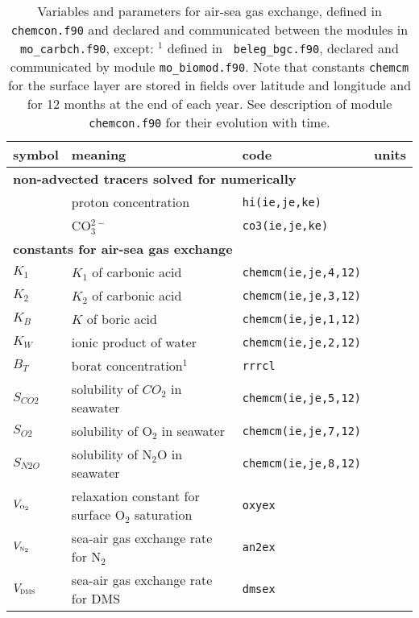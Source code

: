 \documentclass[11pt,a4paper,fleqn,twoside]{article}
\def\ntwo{\text{\textsc{n$_2$}}\,}
\def\oxy{\text{\textsc{o$_2$}}\,}
\def\dms{\text{\textsc{dms}}\,}
\def\dms{\text{\textsc{dms}}\,}
\def\hi{\text{\textsc{H$^+$}}\,}
\def\cartwo{\text{\textsc{CO$_3^{2-}$}}\,}
\begin{document}
\begin{table}[hbt]
\caption{\label{tab_air_sea_params} Variables and parameters for air-sea gas
exchange, defined in {\tt chemcon.f90} and  declared and communicated between
the modules in {\tt mo\_carbch.f90},  except: $^1$ defined in {\tt
beleg\_bgc.f90}, declared and communicated by module {\tt mo\_biomod.f90}. Note
that constants {\tt chemcm} for the surface layer are stored in fields over
latitude and longitude and for 12 months at the end of each year.
See description of module {\tt chemcon.f90} for their evolution with time.} 
\vspace{.2cm}
\begin{center}
\begin{tabular}{llll} \hline
symbol & meaning        & code     & units \\ \hline
\multicolumn{4}{l}{\rule{0mm}{4mm}\bf non-advected tracers solved for
numerically}\\ \hline
\hi      & proton concentration   & {\tt hi(ie,je,ke)}  &\\
\cartwo  & CO$_3^{2-}$            & {\tt co3(ie,je,ke)} & \\
\multicolumn{4}{l}{\rule{0mm}{4mm}\bf constants for air-sea gas exchange}\\ \hline
$K_1$    &$K_1$ of carbonic acid & {\tt chemcm(ie,je,4,12)} & \\
$K_2$    &$K_2$ of carbonic acid & {\tt chemcm(ie,je,3,12)} & \\
$K_B$    &$K$ of boric acid   & {\tt chemcm(ie,je,1,12)} & \\
$K_W$    &ionic product of water  & {\tt chemcm(ie,je,2,12)} & \\
$B_T$    &borat concentration$^1$  & {\tt rrrcl} & \\
$S_{CO2}$&solubility of $CO_2$ in seawater & {\tt chemcm(ie,je,5,12)} & \\
$S_{O2}$ &solubility of O$_2$ in seawater & {\tt chemcm(ie,je,7,12)} & \\
$S_{N2O}$ &solubility of N$_2$O in seawater & {\tt chemcm(ie,je,8,12)} & \\
$V_\oxy$ &relaxation constant for surface O$_2$ saturation & {\tt oxyex} & \\
$V_\ntwo$ &sea-air gas exchange rate for N$_2$ & {\tt an2ex} & \\
$V_\dms$ &sea-air gas exchange rate  for DMS & {\tt dmsex} & \\ \hline
\end{tabular}
\end{center}
\end{table}
\end{document}
